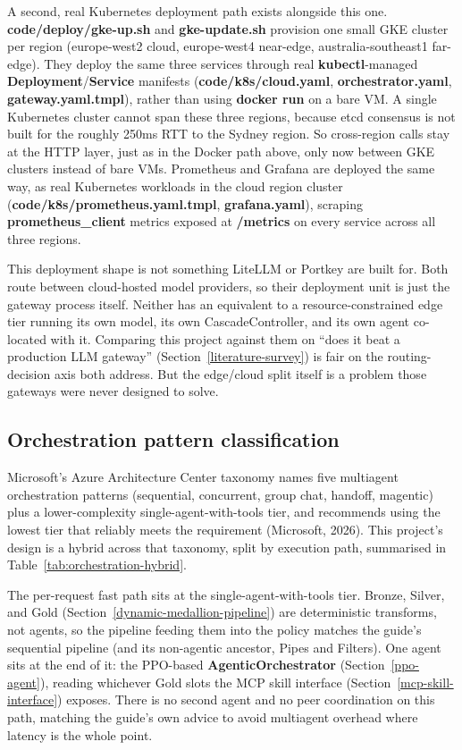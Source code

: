 A second, real Kubernetes deployment path exists alongside this one.
\textbf{code/deploy/gke-up.sh} and \textbf{gke-update.sh} provision one
small GKE cluster per region (europe-west2 cloud, europe-west4
near-edge, australia-southeast1 far-edge). They deploy the same three
services through real \textbf{kubectl}-managed
\textbf{Deployment}/\textbf{Service} manifests
(\textbf{code/k8s/cloud.yaml}, \textbf{orchestrator.yaml},
\textbf{gateway.yaml.tmpl}), rather than using \textbf{docker run} on a bare
VM. A single Kubernetes cluster cannot span these three regions,
because etcd consensus is not built for the roughly 250ms RTT to the
Sydney region. So cross-region calls stay at the HTTP layer, just as in
the Docker path above, only now between GKE clusters instead of bare
VMs. Prometheus and Grafana are deployed the same way, as real
Kubernetes workloads in the cloud region cluster
(\textbf{code/k8s/prometheus.yaml.tmpl}, \textbf{grafana.yaml}),
scraping \textbf{prometheus\_client} metrics exposed at \textbf{/metrics}
on every service across all three regions.

This deployment shape is not something LiteLLM or Portkey are built
for. Both route between cloud-hosted model providers, so their
deployment unit is just the gateway process itself. Neither has an
equivalent to a resource-constrained edge tier running its own model,
its own CascadeController, and its own agent co-located with it.
Comparing this project against them on ``does it beat a production LLM
gateway'' (Section~\ref{literature-survey}) is fair on the routing-decision axis both
address. But the edge/cloud split itself is a problem those gateways
were never designed to solve.


\hypertarget{orchestration-pattern-classification}{%
\subsection{Orchestration pattern
classification}\label{orchestration-pattern-classification}}

Microsoft's Azure Architecture Center taxonomy names five multiagent
orchestration patterns (sequential, concurrent, group chat, handoff,
magentic) plus a lower-complexity single-agent-with-tools tier, and
recommends using the lowest tier that reliably meets the requirement
(Microsoft, 2026). This project's design is a hybrid across that
taxonomy, split by execution path, summarised in
Table~\ref{tab:orchestration-hybrid}.

The per-request fast path sits at the single-agent-with-tools tier.
Bronze, Silver, and Gold (Section~\ref{dynamic-medallion-pipeline}) are
deterministic transforms, not agents, so the pipeline feeding them
into the policy matches the guide's sequential pipeline (and its
non-agentic ancestor, Pipes and Filters). One agent sits at the end of
it: the PPO-based \textbf{AgenticOrchestrator} (Section~\ref{ppo-agent}),
reading whichever Gold slots the MCP skill interface
(Section~\ref{mcp-skill-interface}) exposes. There is no second agent
and no peer coordination on this path, matching the guide's own advice
to avoid multiagent overhead where latency is the whole point.

